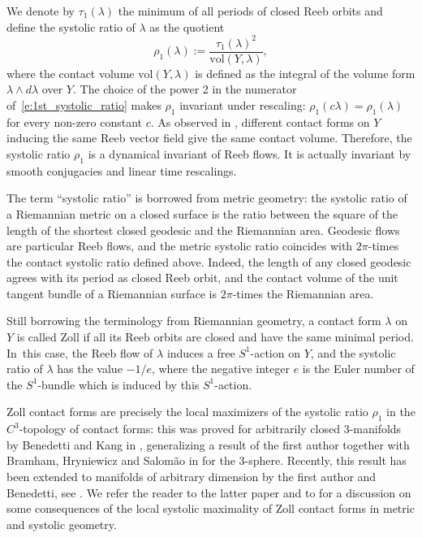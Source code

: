 \documentclass[10pt,a4paper]{amsart}
\theoremstyle{definition}
\newcommand{\vol}{\mathrm{vol}}
\let\eul e
\let\diff d
\begin{document}
We denote by $\tau_1(\lambda)$ the minimum of all periods of closed Reeb orbits and define the systolic ratio of $\lambda$ as the quotient
\begin{equation}
\label{e:1st_systolic_ratio}
\rho_1(\lambda) := \frac{\tau_1(\lambda)^2}{\vol(Y,\lambda)},
\end{equation}
where the contact volume $\vol(Y,\lambda)$ is defined as the integral of the volume form $\lambda\wedge \diff\lambda$ over $Y$. The choice of the power 2 in the numerator of~\eqref{e:1st_systolic_ratio} makes $\rho_1$ invariant under rescaling: $\rho_1(c\lambda) = \rho_1(\lambda)$ for every non-zero constant $c$. As observed in \cite[Lem.\,2.1]{Croke:1994}, different contact forms on $Y$ inducing the same Reeb vector field give the same contact volume. Therefore, the systolic ratio $\rho_1$ is a dynamical invariant of Reeb flows. It is actually invariant by smooth conjugacies and linear time rescalings.

The term ``systolic ratio'' is borrowed from metric geometry: the systolic ratio of a Riemannian metric on a closed surface is the ratio between the square of the length of the shortest closed geodesic and the Riemannian area. Geodesic flows are particular Reeb flows, and the metric systolic ratio coincides with $2\pi$-times the contact systolic ratio defined above. Indeed, the length of any closed geodesic agrees with its period as closed Reeb orbit, and the contact volume of the unit tangent bundle of a Riemannian surface is $2\pi$-times the Riemannian area.

Still borrowing the terminology from Riemannian geometry, a contact form $\lambda$ on~$Y$ is called Zoll if all its Reeb orbits are closed and have the same minimal period. In~this case, the Reeb flow of $\lambda$ induces a free $S^1$-action on $Y$, and the systolic ratio of $\lambda$ has the value $-1/\eul$, where the negative integer $\eul$ is the Euler number of the $S^1$-bundle which is induced by this $S^1$-action.

Zoll contact forms are precisely the local maximizers of the systolic ratio $\rho_1$ in the $C^3$-topology of contact forms: this was proved for arbitrarily closed $3$-manifolds by Benedetti and Kang in \cite{Benedetti:2021aa}, generalizing a result of the first author together with Bramham, Hryniewicz and Salom\~ao in \cite{Abbondandolo:2018fb} for the 3-sphere. Recently, this result has been extended to manifolds of arbitrary dimension by the first author and Benedetti, see \cite{Abbondandolo:2019tl}. We refer the reader to the latter paper and to \cite{Alvarez-Paiva:2014uq} for a discussion on some consequences of the local systolic maximality of Zoll contact forms in metric and systolic geometry.
\end{document}
